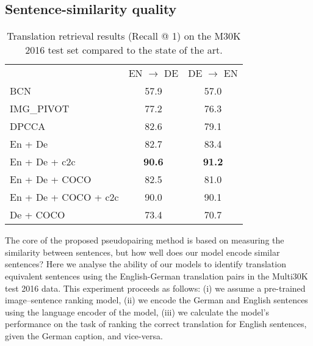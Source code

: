 \subsection{Sentence-similarity quality}

\begin{table}[]
    \centering
    \begin{tabular}{lcc}
    \cmidrule[0.08em](r){1-3}
    & EN {\small $\rightarrow$} DE & DE {\small $\rightarrow$} EN \\
    \cmidrule(rl){1-3}
    BCN & 57.9 & 57.0 \\
    IMG\_PIVOT &  77.2 & 76.3 \\
    DPCCA &  82.6 & 79.1 \\
    \cmidrule(rl){1-3}
    En + De & 82.7   & 83.4  \\
    En + De + c2c & \textbf{90.6} & \textbf{91.2}  \\
    En + De + COCO & 82.5    & 81.0    \\
    En + De + COCO + c2c & 90.0   & 90.1  \\
    De + COCO & 73.4 &  70.7  \\
    \cmidrule[0.08em](r){1-3}
    \end{tabular}
    \caption{Translation retrieval results (Recall @ 1) on the M30K 2016 test set compared to the state of the art.}
    \label{tab:translate}
\end{table}

The core of the proposed pseudopairing method is based on measuring the similarity between sentences, but how well does our model encode similar sentences? Here we analyse the ability of our models to identify translation equivalent sentences using the English-German translation pairs in the Multi30K test 2016 data. This experiment proceeds as follows: (i) we assume a pre-trained image--sentence ranking model, (ii) we encode the German and English sentences using the language encoder of the model, (iii) we calculate the model's performance on the task of ranking the correct translation for English sentences, given the German caption, and vice-versa. 

